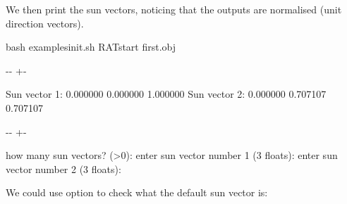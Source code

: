 \documentclass[letterpaper,10pt,english]{sphinxmanual}
\newlength\nbsphinxcodecellspacing
\begin{document}
\begin{sphinxVerbatim}[commandchars=\\\{\}]
       
\end{sphinxVerbatim}

We then print the sun vectors, noticing that the outputs are normalised (unit direction vectors).

{
\begin{sphinxVerbatim}[commandchars=\\\{\}]
\llap{\color{nbsphinxin}[5]:\,\hspace{\fboxrule}\hspace{\fboxsep}}\PYGZpc{}\PYGZpc{}bash
 examples\PYGZus{}init.sh
RATstart first.obj 
\end{sphinxVerbatim}
}

{

\kern-\sphinxverbatimsmallskipamount\kern-\baselineskip
\kern+\FrameHeightAdjust\kern-\fboxrule
\vspace{\nbsphinxcodecellspacing}

\begin{sphinxVerbatim}[commandchars=\\\{\}]
Sun vector 1: 0.000000 0.000000 1.000000
Sun vector 2: 0.000000 0.707107 0.707107
\end{sphinxVerbatim}
}

{

\kern-\sphinxverbatimsmallskipamount\kern-\baselineskip
\kern+\FrameHeightAdjust\kern-\fboxrule
\vspace{\nbsphinxcodecellspacing}

\begin{sphinxVerbatim}[commandchars=\\\{\}]
how many sun vectors? (>0): enter sun vector number 1 (3 floats): enter sun vector number 2 (3 floats):
\end{sphinxVerbatim}
}

We could use option  to check what the default sun vector is:
\end{document}
